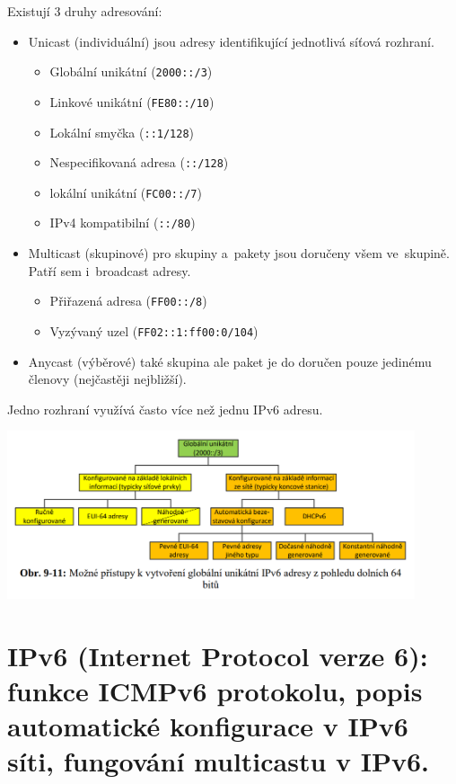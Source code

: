 Existují 3 druhy adresování:
\begin{itemize}[noitemsep]
    \item Unicast (individuální) jsou adresy identifikující jednotlivá síťová rozhraní.
    \begin{itemize}[noitemsep]
        \item Globální unikátní (\texttt{2000::/3})
        \item Linkové unikátní (\texttt{FE80::/10})
        \item Lokální smyčka (\texttt{::1/128})
        \item Nespecifikovaná adresa (\texttt{::/128})
        \item lokální unikátní (\texttt{FC00::/7})
        \item IPv4 kompatibilní (\texttt{::/80})
    \end{itemize}
    \item Multicast (skupinové) pro skupiny a~pakety jsou doručeny všem ve~skupině. Patří sem i~broadcast adresy.
    \begin{itemize}[noitemsep]
        \item Přiřazená adresa (\texttt{FF00::/8})
        \item Vyzývaný uzel (\texttt{FF02::1:ff00:0/104})
    \end{itemize}
    \item Anycast (výběrové) také skupina ale paket je do doručen pouze jedinému členovy (nejčastěji nejbližší).
\end{itemize}

Jedno rozhraní využívá často více než jednu IPv6 adresu.

\begin{center}
	\includegraphics[width=0.9\textwidth]{obrazky/071.png}
\end{center}


\clearpage
\section{IPv6 (Internet Protocol verze 6): funkce ICMPv6 protokolu, popis automatické konfigurace v IPv6 síti, fungování multicastu v IPv6.}

